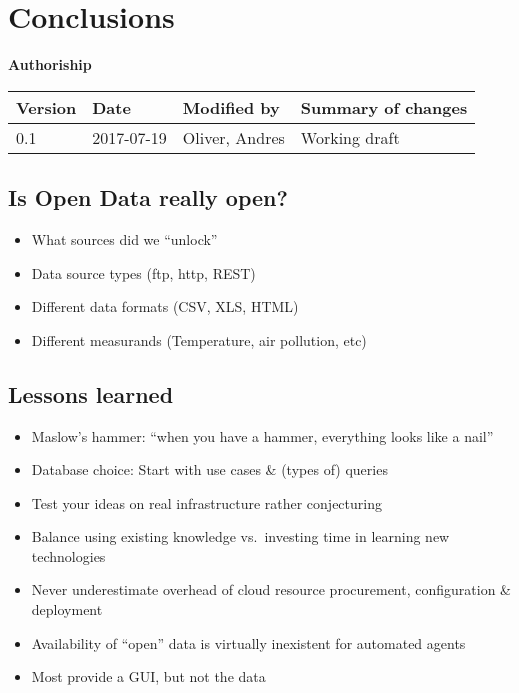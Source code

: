 \section{Conclusions}\label{conclusions}

\textbf{Authoriship}

\begin{longtable}[]{@{}llll@{}}
\toprule
Version & Date & Modified by & Summary of changes\tabularnewline
\midrule
\endhead
0.1 & 2017-07-19 & Oliver, Andres & Working draft\tabularnewline
\bottomrule
\end{longtable}

\subsection{Is Open Data really open?}\label{is-open-data-really-open}

\begin{itemize}
\tightlist
\item
  What sources did we ``unlock''
\item
  Data source types (ftp, http, REST)
\item
  Different data formats (CSV, XLS, HTML)
\item
  Different measurands (Temperature, air pollution, etc)
\end{itemize}

\subsection{Lessons learned}\label{lessons-learned}

\begin{itemize}
\tightlist
\item
  Maslow's hammer: ``when you have a hammer, everything looks like a
  nail''
\item
  Database choice: Start with use cases \& (types of) queries
\item
  Test your ideas on real infrastructure rather conjecturing
\item
  Balance using existing knowledge vs.~investing time in learning new
  technologies
\item
  Never underestimate overhead of cloud resource procurement,
  configuration \& deployment
\item
  Availability of ``open'' data is virtually inexistent for automated
  agents
\item
  Most provide a GUI, but not the data
\end{itemize}

